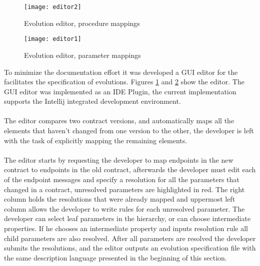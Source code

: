 \begin{figure}[htbp]
    \centering
    \centerline{\texttt{[image: editor2]}}
    \caption{Evolution editor, procedure mappings}
    \label{fig:editor1}
\end{figure}

\begin{figure}[htbp]
    \centering
    \centerline{\texttt{[image: editor1]}}
    \caption{Evolution editor, parameter mappings}
    \label{fig:editor2}
\end{figure}

\newpage

To minimize the documentation effort it was developed a GUI editor for the facilitates the specification of evolutions.
Figures \ref{fig:editor1} and \ref{fig:editor2} show the editor.
The GUI editor was implemented as an IDE Plugin, the current implementation supports the Intellij integrated development environment.

\paragraph{}

The editor compares two contract versions,
and automatically maps all the elements that haven't changed from one version to the other, the
developer is left with the task of explicitly mapping the remaining elements.

\paragraph{}

The editor starts by requesting the developer to map endpoints in the new contract to endpoints in the old contract,
afterwards the developer must edit each of the endpoint messages and specify a resolution for all the parameters that changed
in a contract, unresolved parameters are highlighted in red.
The right column holds the resolutions that were already mapped and uppermost left column allows the developer to write rules
for each unresolved parameter.
The developer can select leaf parameters in the hierarchy, or can choose intermediate properties.
If he chooses an intermediate property and inputs resolution rule all child parameters are also resolved.
After all parameters are resolved the developer submits the resolutions, and
the editor outputs an evolution specification file with the same description language presented in the beginning of this section.

